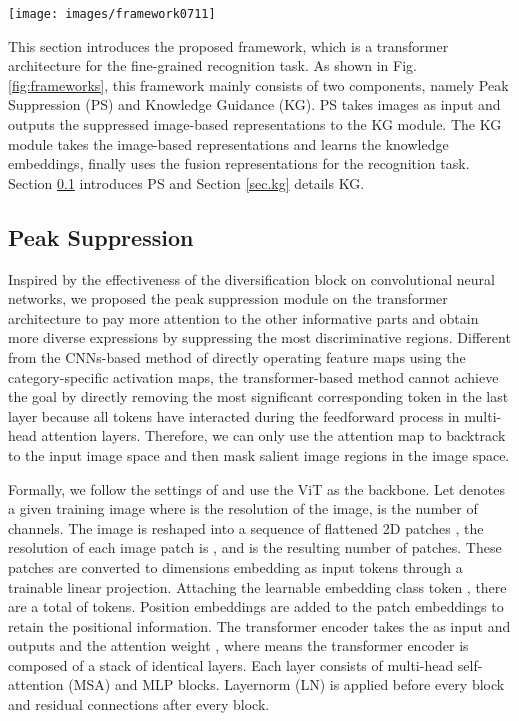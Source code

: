 \documentclass[5p,twocolumn]{elsarticle}
\begin{document}
\begin{figure*}
\centering
 \texttt{[image: images/framework0711]}
  \caption{Overview of our framework. Here we visualize the case of peak suppression and knowledge guidance given a training batch with a image and its corresponding label Yellow-breasted Chat.  means the similarity function. Only the presentation label is used to predict in testing.}
  \label{fig:frameworks}
\end{figure*}

This section introduces the proposed framework, which is a transformer architecture for the fine-grained recognition task. 
As shown in Fig. \ref{fig:frameworks}, this framework mainly consists of two components,  namely  Peak Suppression (PS) and Knowledge Guidance (KG).
PS takes images as input and outputs the suppressed image-based representations to the KG module.  The KG module takes the image-based representations and learns the knowledge embeddings, finally uses the fusion representations for the recognition task. 
Section \ref{sec.ps} introduces PS and Section \ref{sec.kg} details KG.

\subsection{Peak Suppression} \label{sec.ps}
Inspired by the effectiveness of the diversification block on convolutional neural networks, we proposed the peak suppression module on the transformer architecture to pay more attention to the other informative parts and obtain more diverse expressions by suppressing the most discriminative regions. Different from the CNNs-based method of directly operating feature maps using the category-specific activation maps, the transformer-based method cannot achieve the goal by directly removing the most significant corresponding token in the last layer because all tokens have interacted during the feedforward process in multi-head attention layers. Therefore, we can only use the attention map to backtrack to the input image space and then mask salient image regions in the image space. 

Formally, we follow the settings of \cite{Dosovitskiy2021Image} and use the ViT as the backbone. Let  denotes a given training image where  is the resolution of the image,  is the number of channels. 
The image  is reshaped into a sequence of flattened 2D patches , the resolution of each image patch is , and  is the resulting number of patches. These patches are converted to  dimensions embedding  as input tokens through a trainable linear projection. Attaching the learnable embedding class token , there are a total of  tokens. Position embeddings  are added to the patch embeddings  to retain the positional information. The transformer encoder takes the  as input and outputs  and the attention weight , where  means the transformer encoder is composed of a stack of  identical layers. 
Each layer consists of multi-head self-attention (MSA) and MLP blocks. Layernorm (LN) is applied before every block and residual connections after every block.
\end{document}
